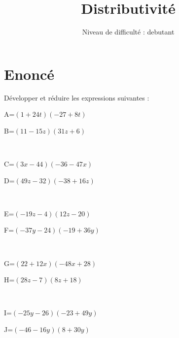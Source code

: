 \documentclass{article}%
\title{Distributivité}%
\author{Niveau de difficulté : debutant}%
\date{{}}%
\begin{document}
%
\normalsize%
\pagestyle{empty}%
\maketitle%
\section{Enoncé}%
\label{sec:Enonc}%
Développer et réduire les expressions suivantes :%
\newline%
%
\newline%
%
\begin{minipage}{0.5\textwidth}%
A=$(1+24t)(-27+8t)$\\%
\end{minipage}%
\begin{minipage}{0.5\textwidth}%
B=$(11-15z)(31z+6)$\\%
\end{minipage}%
\\%
\begin{minipage}{0.5\textwidth}%
C=$(3x-44)(-36-47x)$\\%
\end{minipage}%
\begin{minipage}{0.5\textwidth}%
D=$(49z-32)(-38+16z)$\\%
\end{minipage}%
\\%
\begin{minipage}{0.5\textwidth}%
E=$(-19z-4)(12z-20)$\\%
\end{minipage}%
\begin{minipage}{0.5\textwidth}%
F=$(-37y-24)(-19+36y)$\\%
\end{minipage}%
\\%
\begin{minipage}{0.5\textwidth}%
G=$(22+12x)(-48x+28)$\\%
\end{minipage}%
\begin{minipage}{0.5\textwidth}%
H=$(28z-7)(8z+18)$\\%
\end{minipage}%
\\%
\begin{minipage}{0.5\textwidth}%
I=$(-25y-26)(-23+49y)$\\%
\end{minipage}%
\begin{minipage}{0.5\textwidth}%
J=$(-46-16y)(8+30y)$\\%
\end{minipage}%
\\
\end{document}
